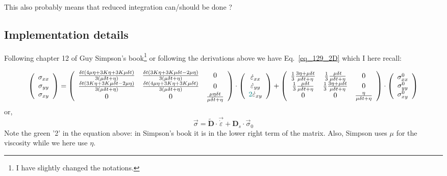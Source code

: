 This also probably means that reduced integration can/should be done ?

\subsection*{Implementation details}

Following chapter 12 of Guy Simpson's book\footnote{I have slightly changed the notations.} \cite{simp17} 
or following the derivations above we have Eq.~\eqref{eq_129_2D}
which I here recall:

\[
\left(
\begin{array}{c}
\sigma_{xx}\\ 
\sigma_{yy}\\ 
\sigma_{xy} 
\end{array}
\right)
=
\left(
\begin{array}{ccc}
\frac{\delta t(4\mu \eta + 3K \eta+ 3K \mu\delta t)}{3(\mu \delta t + \eta)} &
\frac{\delta t(3K \eta+ 3K \mu\delta t - 2\mu \eta)}{3(\mu \delta t + \eta)} &
0 \\
\frac{\delta t(3K \eta+ 3K \mu\delta t  - 2\mu \eta)}{3(\mu \delta t + \eta)}&
\frac{\delta t(4\mu \eta + 3K \eta+ 3K \mu\delta t)}{3(\mu \delta t + \eta)} &
0  \\
0 & 0 & \frac{\mu \eta \delta t }{\mu \delta t + \eta}  \\
\end{array}
\right)
\cdot
\left(
\begin{array}{c}
\dot\varepsilon_{xx}\\ 
\dot\varepsilon_{yy}\\ 
{\color{teal}2}\dot\varepsilon_{xy} 
\end{array}
\right) 
+
\left(
\begin{array}{cccccc}
\frac13\frac{3\eta + \mu \delta t}{\mu\delta t+\eta} & 
\frac13\frac{\mu \delta t}{\mu\delta t+\eta} & 
0\\
\frac13\frac{\mu \delta t}{\mu\delta t+\eta} & 
\frac13\frac{3\eta + \mu \delta t}{\mu\delta t+\eta} & 
0\\
0 & 0 & \frac{ \eta}{\mu\delta t + \eta}  
\end{array}
\right)
\cdot
\left(
\begin{array}{c}
\sigma_{xx}^0\\ 
\sigma_{yy}^0\\ 
\sigma_{xy}^0 
\end{array}
\right) 
\]
or, 
\[
\vec{\sigma} = \tilde{\bm D}\cdot \vec{\dot{\varepsilon}} +
{\bm D}_s \cdot \vec{\sigma}_0 
\]
Note the green '2' in the equation above: in Simpson's book it is in the
lower right term of the matrix. Also, Simpson uses $\mu$ for the viscosity
while we here use $\eta$. 

